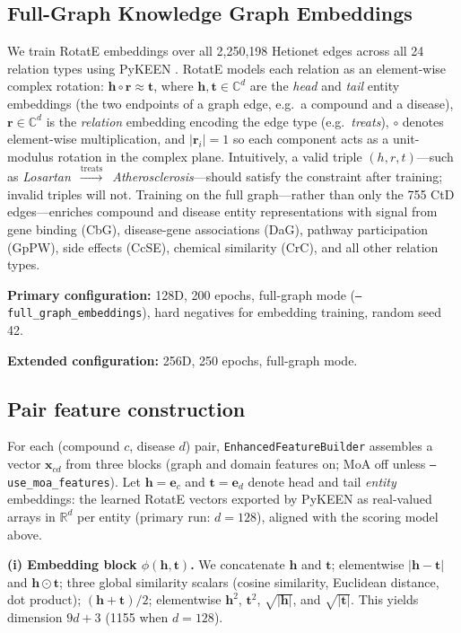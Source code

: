 \documentclass[10pt,twocolumn]{article}
\begin{document}
\subsection{Full-Graph Knowledge Graph Embeddings}

We train RotatE \cite{rotate2019} embeddings over all 2,250,198 Hetionet edges across all 24 relation types using PyKEEN \cite{pykeen2021}.
RotatE models each relation as an element-wise complex
rotation: $\mathbf{h}\circ\mathbf{r}\approx\mathbf{t}$,
where $\mathbf{h},\mathbf{t}\in\mathbb{C}^d$ are the \emph{head} and
\emph{tail} entity embeddings (the two endpoints of a graph edge, e.g.\
a compound and a disease), $\mathbf{r}\in\mathbb{C}^d$ is the
\emph{relation} embedding encoding the edge type (e.g.\ \emph{treats}),
$\circ$ denotes element-wise multiplication, and $|\mathbf{r}_i|=1$ so
each component acts as a unit-modulus rotation in the complex plane.
Intuitively, a valid triple $(h, r, t)$---such as
\textit{Losartan}~$\xrightarrow{\mathrm{treats}}$~\textit{Atherosclerosis}---should
satisfy the constraint after training; invalid triples will not.
Training on the full graph---rather than only the 755 CtD edges---enriches compound and disease entity representations with signal from gene binding (CbG), disease-gene associations (DaG), pathway participation (GpPW), side effects (CcSE), chemical similarity (CrC), and all other relation types.

\textbf{Primary configuration:} 128D, 200 epochs, full-graph mode (\texttt{--full\_graph\_embeddings}), hard negatives for embedding training, random seed 42.

\textbf{Extended configuration:} 256D, 250 epochs, full-graph mode.

\subsection{Pair feature construction}

For each (compound $c$, disease $d$) pair, \texttt{EnhancedFeatureBuilder} assembles a vector $\mathbf{x}_{cd}$ from three blocks (graph and domain features on; MoA off unless \texttt{--use\_moa\_features}). Let $\mathbf{h}=\mathbf{e}_c$ and $\mathbf{t}=\mathbf{e}_d$ denote head and tail \emph{entity} embeddings: the learned RotatE vectors exported by PyKEEN as real-valued arrays in $\mathbb{R}^{d}$ per entity (primary run: $d=128$), aligned with the scoring model above.

\textbf{(i) Embedding block $\phi(\mathbf{h},\mathbf{t})$.} We concatenate $\mathbf{h}$ and $\mathbf{t}$; elementwise $|\mathbf{h}-\mathbf{t}|$ and $\mathbf{h}\odot\mathbf{t}$; three global similarity scalars (cosine similarity, Euclidean distance, dot product); $(\mathbf{h}+\mathbf{t})/2$; elementwise $\mathbf{h}^{2}$, $\mathbf{t}^{2}$, $\sqrt{|\mathbf{h}|}$, and $\sqrt{|\mathbf{t}|}$. This yields dimension $9d+3$ (1155 when $d=128$).
\end{document}

